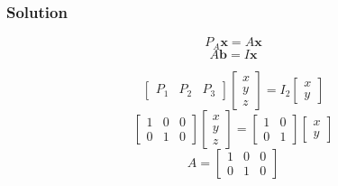 \documentclass[12pt]{article}
\begin{document}
\subsubsection*{Solution}
\vspace{0.25in}
\[
  P_A\textbf{x} = A\textbf{x}
\]
\[
  A\textbf{b} = I\textbf{x}
\]

\[
  \begin{bmatrix}
    P_1 & P_2 & P_3 
  \end{bmatrix}
  \begin{bmatrix}
    x\\ 
    y\\ 
    z 
  \end{bmatrix}
  = I_2
  \begin{bmatrix}
    x\\ 
    y 
  \end{bmatrix}
\]
\[
  \begin{bmatrix}
    1 & 0 & 0\\ 
    0 & 1 & 0 
  \end{bmatrix}
  \begin{bmatrix}
    x\\ 
    y\\ 
    z 
  \end{bmatrix}
  = 
  \begin{bmatrix}
    1 & 0\\ 
    0 & 1 
  \end{bmatrix}
  \begin{bmatrix}
    x\\ 
    y 
  \end{bmatrix}
\]
\[
  A = \begin{bmatrix}
    1 & 0 & 0\\ 
    0 & 1 & 0 
  \end{bmatrix}
\]
\end{document}
